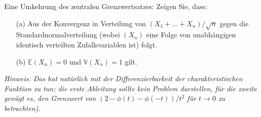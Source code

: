 \begin{exercise}
Eine Umkehrung des zentralen Grenzwertsatzes: Zeigen Sie, dass:
\begin{itemize}
    \item[(a)] Aus der Konvergenz in Verteilung von $(X_1 + \dots + X_n)/\sqrt{n}$
    gegen die Standardnormalverteilung (wobei $(X_n)$ eine Folge von unabhängigen
    identisch verteilten Zufallsvariablen ist) folgt.
    \item[(b)] $\mathbb{E}(X_n) = 0 $ und $\mathbb{V}(X_n) = 1 $ gilt.
\end{itemize}
\textit{Hinweis: Das hat natürlich mit der Differenzierbarkeit der charakteristischen
Funktion zu tun; die erste Ableitung sollte kein Problem darstellen, für die zweite
genügt es, den Grenzwert von $(2 - \phi(t) - \phi(-t))/t^2$ für $t \rightarrow 0 $ zu betrachten).}
\end{exercise}
\begin{solution}
\end{solution}
